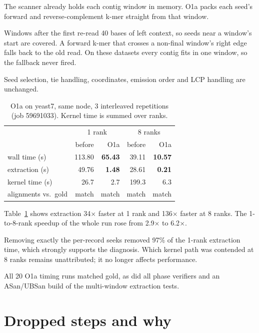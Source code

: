\documentclass[sigconf,nonacm]{acmart}
\begin{document}
The scanner already holds each contig window in memory. O1a packs each seed's
forward and reverse-complement k-mer straight from that window.

Windows after the first re-read 40 bases of left context, so seeds near a
window's start are covered. A forward k-mer that crosses a non-final window's
right edge falls back to the old read. On these datasets every contig fits in
one window, so the fallback never fired.

Seed selection, tie handling, coordinates, emission order and LCP handling
are unchanged.

\begin{table}[t]
\caption{O1a on yeast7, same node, 3 interleaved repetitions (job 59691033).
Kernel time is summed over ranks.}
\label{tab:o1a}
\small
\begin{tabular}{@{}lrrrr@{}}
\toprule
 & \multicolumn{2}{c}{1 rank} & \multicolumn{2}{c}{8 ranks} \\
 & before & O1a & before & O1a \\
\midrule
wall time (s) & 113.80 & \textbf{65.43} & 39.11 & \textbf{10.57} \\
extraction (s) & 49.76 & \textbf{1.48} & 28.61 & \textbf{0.21} \\
kernel time (s) & 26.7 & 2.7 & 199.3 & 6.3 \\
alignments vs.\ gold & match & match & match & match \\
\bottomrule
\end{tabular}
\end{table}

Table~\ref{tab:o1a} shows extraction 34$\times$ faster at 1 rank and
136$\times$ faster at 8 ranks. The 1-to-8-rank speedup of the whole run rose
from 2.9$\times$ to 6.2$\times$.

Removing exactly the per-record seeks removed 97\% of the 1-rank extraction
time, which strongly supports the diagnosis. Which kernel path was contended
at 8 ranks remains unattributed; it no longer affects performance.

All 20 O1a timing runs matched gold, as did all phase verifiers and an
ASan/UBSan build of the multi-window extraction tests.

\section{Dropped steps and why}
\end{document}
